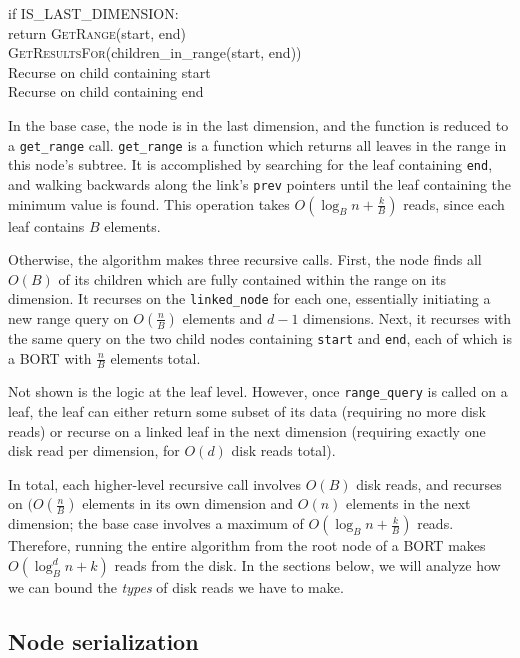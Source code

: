 \documentclass[11pt, oneside]{article}
\newcommand{\ms}{\texttt}
\begin{document}
    if IS\_LAST\_DIMENSION: \\
        return \textsc{GetRange}(start, end) \\

    \textsc{GetResultsFor}(children\_in\_range(start, end)) \\

    Recurse on child containing start \\
    Recurse on child containing end

In the base case, the node is in the last dimension, and the function is reduced
to a \ms{get\_range} call. \ms{get\_range} is a function which returns all
leaves in the range in this node's subtree. It is accomplished by searching for
the leaf containing \ms{end}, and walking backwards along the link's \ms{prev}
pointers until the leaf containing the minimum value is found. This operation
takes $O(\log_B n + \frac{k}{B})$ reads, since each leaf contains $B$ elements.

Otherwise, the algorithm makes three recursive calls. First, the node finds all
$O(B)$ of its children which are fully contained within the range on its
dimension. It recurses on the \ms{linked\_node} for each one, essentially
initiating a new range query on $O(\frac{n}{B})$ elements and $d - 1$
dimensions. Next, it recurses with the same query on the two child nodes
containing \ms{start} and \ms{end}, each of which is a BORT with $\frac{n}{B}$
elements total.

Not shown is the logic at the leaf level. However, once \ms{range\_query} is
called on a leaf, the leaf can either return some subset of its data (requiring
no more disk reads) or recurse on a linked leaf in the next dimension (requiring
exactly one disk read per dimension, for $O(d)$ disk reads total).

In total, each higher-level recursive call involves $O(B)$ disk reads, and
recurses on $(O(\frac{n}{B})$ elements in its own dimension and $O(n)$ elements
in the next dimension; the base case involves a maximum of $O(\log_B n +
\frac{k}{B})$ reads. Therefore, running the entire algorithm from the root node
of a BORT makes $O(\log_B^d n + k)$ reads from the disk. In the sections below,
we will analyze how we can bound the \textit{types} of disk reads we have to
make.

\subsection{Node serialization}
\end{document}
